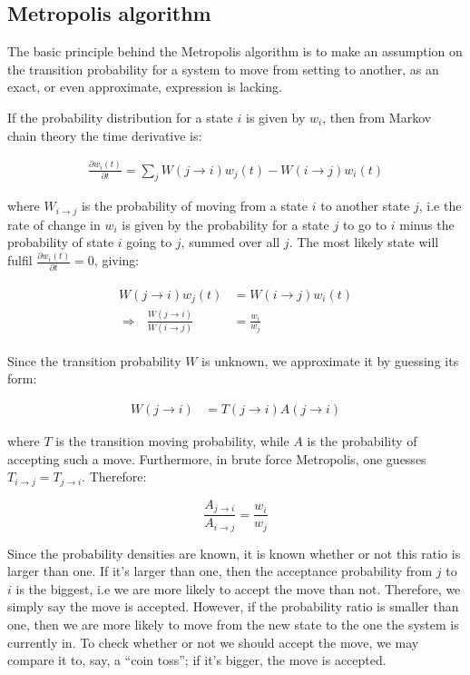 \documentclass[english, a4paper]{article}
\begin{document}
\subsection{Metropolis algorithm}
The basic principle behind the Metropolis algorithm is to make an assumption on the transition probability for a system to move from setting to another, as
an exact, or even approximate, expression is lacking.

If the probability distribution for a state $i$ is given by $w_i$, then from Markov chain theory the time derivative is:

\begin{align}
 \frac{\partial w_i(t)}{\partial t} = \sum_j W(j\rightarrow i)w_j(t) - W(i\rightarrow j)w_i(t)
\end{align}

where $W_{i\rightarrow j}$ is the probability of moving from a state $i$ to another state $j$, i.e the rate of change in $w_i$ is given by the probability for a state $j$ to go to $i$ minus the
probability of state $i$ going to $j$, summed over all $j$.
The most likely state will fulfil $\frac{\partial w_i(t)}{\partial t} = 0$, giving:

\begin{align}
\begin{split}
  W(j\rightarrow i)w_j(t) &=  W(i\rightarrow j)w_i(t)\\
 \Rightarrow\:\:\:\frac{  W(j\rightarrow i)}{  W(i\rightarrow j)} &= \frac{w_i}{w_j}
\end{split}
\end{align}

Since the transition probability $W$ is unknown, we approximate it by guessing its form:

\begin{align}
 W(j\rightarrow i) &= T(j\rightarrow i) A(j\rightarrow i)
\end{align}

where $T$ is the transition moving probability, while $A$ is the probability of accepting such a move. Furthermore, in brute force Metropolis, one guesses $T_{i\rightarrow j} = T_{j\rightarrow i}$.
Therefore:

\begin{equation}
 \frac{A_{j\rightarrow i}}{A_{i\rightarrow j}} = \frac{w_i}{w_j}
\end{equation}

Since the probability densities are known, it is known whether or not this ratio is larger than one. If it's larger than one, then the acceptance probability from $j$ to $i$ is the biggest, i.e we are more likely to accept the move than not.
Therefore, we simply say the move is accepted. However, if the probability ratio is smaller than one, then we are more likely to move from the new state to the one the system is currently in.
To check whether or not we should accept the move, we may compare it to, say, a ``coin toss''; if it's bigger, the move is accepted.
\end{document}
